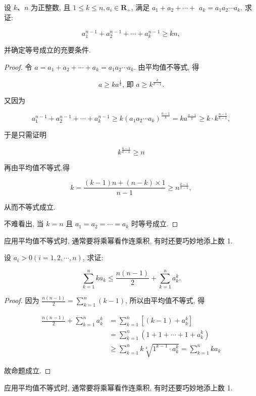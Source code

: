 \begin{example}
	设 $k 、 n$ 为正整数, 且 $1 \leqslant k \leqslant n, a_{i} \in \mathbf{R}_{+}$, 满足 $a_{1}+a_{2}+\cdots+$ $a_{k}=a_{1} a_{2} \cdots a_{k}$. 求证:
	
	$$
	a_{1}^{n-1}+a_{2}^{n-1}+\cdots+a_{k}^{n-1} \geqslant k n,
	$$
	
	并确定等号成立的充要条件.
\end{example}
\begin{proof}
	令 $a=a_{1}+a_{2}+\cdots+a_{k}=a_{1} a_{2} \cdots a_{k}$. 由平均值不等式, 得
	
	$$
	a \geqslant k a^{\frac{1}{k}} \text {, 即 } a \geqslant k^{\frac{k}{k-1}} .
	$$
	
	又因为
	
	$$
	a_{1}^{n-1}+a_{2}^{n-1}+\cdots+a_{k}^{n-1} \geqslant k\left(a_{1} a_{2} \cdots a_{k}\right)^{\frac{n-1}{k}}=k a^{\frac{n-1}{k}} \geqslant k \cdot k^{\frac{n-1}{k-1}},
	$$
	
	于是只需证明
	
	$$
	k^{\frac{n-1}{k-1}} \geqslant n
	$$
	
	再由平均值不等式,得
	
	$$
	k=\frac{(k-1) n+(n-k) \times 1}{n-1} \geqslant n^{\frac{k-1}{n-1}},
	$$
	
	从而不等式成立.
	
	不难看出, 当 $k=n$ 且 $a_{1}=a_{2}=\cdots=a_{k}$ 时等号成立.
\end{proof}
\begin{note}
	应用平均值不等式时, 通常要将乘幂看作连乘积, 有时还要巧妙地添上数 1.
\end{note}

\begin{example}
	设 $a_{i}>0(i=1,2, \cdots, n)$, 求证:
	
	$$
	\sum_{k=1}^{n} k a_{k} \leqslant \frac{n(n-1)}{2}+\sum_{k=1}^{n} a_{k}^{k} .
	$$
\end{example}
\begin{proof}
	因为 $\frac{n(n-1)}{2}=\sum_{k=1}^{n}(k-1)$, 所以由平均值不等式, 得
	
	$$
	\begin{aligned}
	\frac{n(n-1)}{2}+\sum_{k=1}^{n} a_{k}^{k} & =\sum_{k=1}^{n}\left[(k-1)+a_{k}^{k}\right] \\
	& =\sum_{k=1}^{n}\left(1+1+\cdots+1+a_{k}^{k}\right) \\
	& \geqslant \sum_{k=1}^{n} k \sqrt[k]{1^{k-1} \cdot a_{k}^{k}}=\sum_{k=1}^{n} k a_{k}
	\end{aligned}
	$$
	
	故命题成立.
\end{proof}
\begin{note}
	应用平均值不等式时, 通常要将乘幂看作连乘积, 有时还要巧妙地添上数 1.
\end{note}

